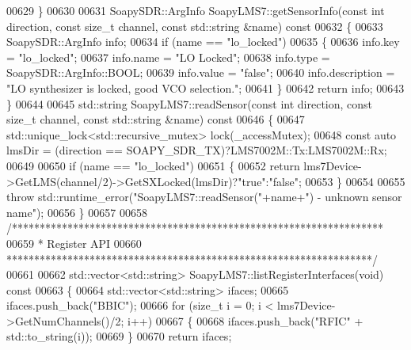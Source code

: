 \begin{DoxyCode}
{{{{{{{{{{{{{{00629 \}
00630 
00631 SoapySDR::ArgInfo SoapyLMS7::getSensorInfo(\textcolor{keyword}{const} \textcolor{keywordtype}{int} direction, \textcolor{keyword}{const} \textcolor{keywordtype}{size\_t} channel, \textcolor{keyword}{const} 
      std::string &name)\textcolor{keyword}{ const}
00632 \textcolor{keyword}{}\{
00633     SoapySDR::ArgInfo info;
00634     \textcolor{keywordflow}{if} (name == \textcolor{stringliteral}{"lo\_locked"})
00635     \{
00636         info.key = \textcolor{stringliteral}{"lo\_locked"};
00637         info.name = \textcolor{stringliteral}{"LO Locked"};
00638         info.type = SoapySDR::ArgInfo::BOOL;
00639         info.value = \textcolor{stringliteral}{"false"};
00640         info.description = \textcolor{stringliteral}{"LO synthesizer is locked, good VCO selection."};
00641     \}
00642     \textcolor{keywordflow}{return} info;
00643 \}
00644 
00645 std::string SoapyLMS7::readSensor(\textcolor{keyword}{const} \textcolor{keywordtype}{int} direction, \textcolor{keyword}{const} \textcolor{keywordtype}{size\_t} channel, \textcolor{keyword}{const} 
      std::string &name)\textcolor{keyword}{ const}
00646 \textcolor{keyword}{}\{
00647     std::unique\_lock<std::recursive\_mutex> lock(_accessMutex);
00648     \textcolor{keyword}{const} \textcolor{keyword}{auto} lmsDir = (direction == SOAPY_SDR_TX)?LMS7002M::Tx:LMS7002M::Rx;
00649 
00650     \textcolor{keywordflow}{if} (name == \textcolor{stringliteral}{"lo\_locked"})
00651     \{
00652         \textcolor{keywordflow}{return} lms7Device->GetLMS(channel/2)->GetSXLocked(lmsDir)?\textcolor{stringliteral}{"true"}:\textcolor{stringliteral}{"false"};
00653     \}
00654 
00655     \textcolor{keywordflow}{throw} std::runtime\_error(\textcolor{stringliteral}{"SoapyLMS7::readSensor("}+name+\textcolor{stringliteral}{") - unknown sensor name"});
00656 \}
00657 
00658 \textcolor{comment}{/*******************************************************************}
00659 \textcolor{comment}{ * Register API}
00660 \textcolor{comment}{ ******************************************************************/}
00661 
00662 std::vector<std::string> SoapyLMS7::listRegisterInterfaces(\textcolor{keywordtype}{void})\textcolor{keyword}{ const}
00663 \textcolor{keyword}{}\{
00664     std::vector<std::string> ifaces;
00665     ifaces.push\_back(\textcolor{stringliteral}{"BBIC"});
00666     \textcolor{keywordflow}{for} (\textcolor{keywordtype}{size\_t} i = 0; i < lms7Device->GetNumChannels()/2; i++)
00667     \{
00668         ifaces.push\_back(\textcolor{stringliteral}{"RFIC"} + std::to\_string(i));
00669     \}
00670     \textcolor{keywordflow}{return} ifaces;
}}}}}}}}}}}}}}
\end{DoxyCode}
